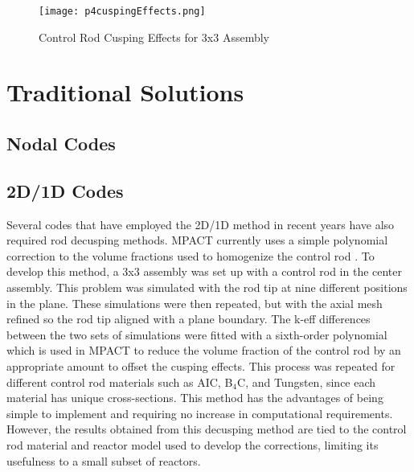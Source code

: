 \begin{figure}
    \centering
    \texttt{[image: p4cuspingEffects.png]}
    \caption{Control Rod Cusping Effects for 3x3 Assembly}\label{f:p4cuspingEffects}
\end{figure}

\section{Traditional Solutions}

\subsection{Nodal Codes}


\subsection{2D/1D Codes}\label{ss:2d1d-old-decusping-methods}

Several codes that have employed the 2D/1D method in recent years have also required rod decusping methods.  MPACT currently uses a simple polynomial correction to the volume fractions used to homogenize the control rod \cite{MC2015_VCS_Cycle_Depletion}.  To develop this method, a 3x3 assembly was set up with a control rod in the center assembly.  This problem was simulated with the rod tip at nine different positions in the plane.  These simulations were then repeated, but with the axial mesh refined so the rod tip aligned with a plane boundary.  The k-eff differences between the two sets of simulations were fitted with a sixth-order polynomial which is used in MPACT to reduce the volume fraction of the control rod by an appropriate amount to offset the cusping effects.  This process was repeated for different control rod materials such as AIC, B$_4$C, and Tungsten, since each material has unique cross-sections.  This method has the advantages of being simple to implement and requiring no increase in computational requirements.  However, the results obtained from this decusping method are tied to the control rod material and reactor model used to develop the corrections, limiting its usefulness to a small subset of reactors.


